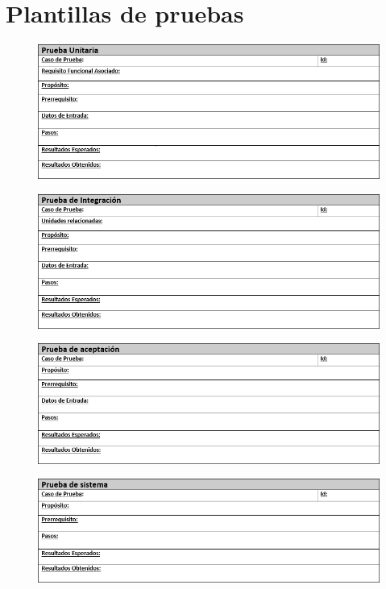 \section{Plantillas de pruebas}

\begin{figure}[H]
\centering
\includegraphics[width=1\textwidth]{figures/anexos/6-2-1-2.PNG}
\end{figure}

\begin{figure}[H]
\centering
\includegraphics[width=1\textwidth]{figures/anexos/6-2-2-2.PNG}
\end{figure}

\begin{figure}[H]
\centering
\includegraphics[width=1\textwidth]{figures/anexos/6-2-3-1.PNG}
\end{figure}

\begin{figure}[H]
\centering
\includegraphics[width=1\textwidth]{figures/anexos/6-2-4-1.PNG}
\end{figure}